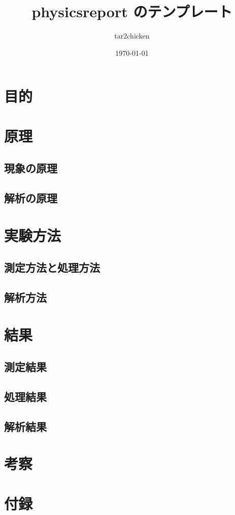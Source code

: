 \documentclass[dvipdfmx]{jsarticle}
\title{physicsreport のテンプレート}
\author{tar2chicken}
\date{\today}
\begin{document}
\maketitle
\tableofcontents
\section{目的}


\section{原理}
	\subsection{現象の原理}
	\subsection{解析の原理}


\section{実験方法}
	\subsection{測定方法と処理方法}
	\subsection{解析方法}


\section{結果}
	\subsection{測定結果}
	\subsection{処理結果}
	\subsection{解析結果}


\section{考察}


\section{付録}
\end{document}
